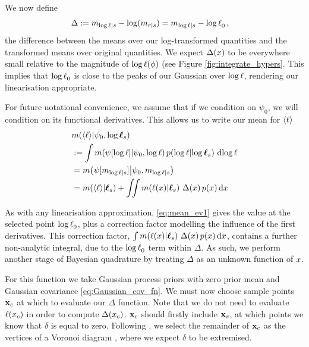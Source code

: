 \documentclass{article}
\begin{document}
We now define
\begin{align*}
\Delta & \deq m_{\tr |s} - \log(m_{r|s}) = m_{\tr |s}  - \tr_0 \,,
\end{align*}
the difference between the \gpb means over our log-transformed quantities and the transformed \gpb means over original quantities. 
We expect $\Delta(\lfv)$ to be everywhere small relative to the magnitude of $\tr(\phi)$ (see Figure \ref{fig:integrate_hypers}. This implies that
 $\tr_0$ is close to the peaks of our Gaussian over $\tr$, rendering our linearisation appropriate. 

For future notational convenience, we assume that if we condition on $\psi_0$, we will condition on its functional derivatives. This allows us to write our mean for  $\inty{\lfn}$
%
\begin{align}
& \mean{\inty{\lfn}}{\psi_0,\tvr_s} \nonumber\\
& \deq \int \mean{\psi[\tr]}{\psi_0,\tr}
\p{\tr}{\tvr_s}\, \ud \tr 
\nonumber\\
& = \mean{\psi[m_{\tr|s}]}{\psi_0,m_{\tr|s}} \nonumber\\
& = \mean{\inty{\lfn}}{\vr_s} + \iint \mean{\lfn(\lfv)}{\vr_s}\,
\Delta(\lfv)\,\po{\lfv}\ud\lfv
\label{eq:mean_ev1}
\end{align}

As with any linearisation approximation, \eqref{eq:mean_ev1} gives the value at the selected point $\tr_0$, plus a correction factor modelling the influence of the first derivatives. This correction factor, 
$\int \mean{\lfn(\lfv)}{\vr_s}\,
\Delta(\lfv)\,\po{\lfv}\ud\lfv$,
contains a further non-analytic integral, due to the $\tr_0$ term within $\Delta$. As such, we perform another stage of Bayesian quadrature by treating $\Delta$ as an unknown function of $\lfv$.


For this function we take Gaussian process priors with zero prior mean and Gaussian covariance \eqref{eq:Gaussian_cov_fn}. We must now choose sample points $\vlfv_c$ at which to evaluate our $\Delta$ function. 
Note that we do not need to evaluate $\lfn(\lfv_c)$ in order to compute $\Delta(\lfv_c)$.
$\vlfv_c$ should firstly include $\vlfv_s$, at which points we know that $\delta$ is equal to zero. Following \cite{BQR}, we select the remainder of $\vlfv_c$  as the  vertices of a Voronoi diagram \citep{okabe1997locational}, where we expect $\delta$ to be extremised. 
\end{document}
